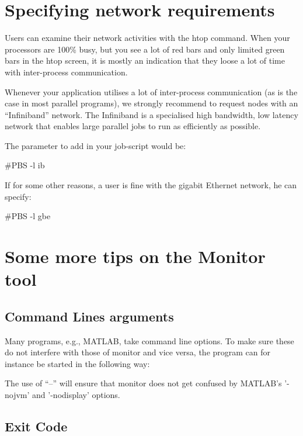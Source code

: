 \section{Specifying network requirements}

Users can examine their network activities with the htop command. When your
processors are 100\% busy, but you see a lot of red bars and only limited green
bars in the htop screen, it is mostly an indication that they loose a lot of
time with inter-process communication.

Whenever your application utilises a lot of inter-process communication (as is
the case in most parallel programs), we strongly recommend to request nodes
with an ``Infiniband'' network. The Infiniband is a specialised high bandwidth,
low latency network that enables large parallel jobs to run as efficiently as
possible.

The parameter to add in your job-script would be:
\begin{prompt}
#PBS -l ib
\end{prompt}

If for some other reasons, a user is fine with the gigabit Ethernet network, he
can specify:

\begin{prompt}
#PBS -l gbe
\end{prompt}

\ifgent
\else
  \section{Some more tips on the Monitor tool}
  
  \subsection{Command Lines arguments}
  
  Many programs, e.g., MATLAB, take command line options. To make sure these do
  not interfere with those of monitor and vice versa, the program can for
  instance be started in the following way:
  
  \begin{prompt}
  \end{prompt}
  
  The use of ``--'' will ensure that monitor does not get confused by MATLAB's '-nojvm' and '-nodisplay' options.
  
  \subsection{Exit Code}
  
